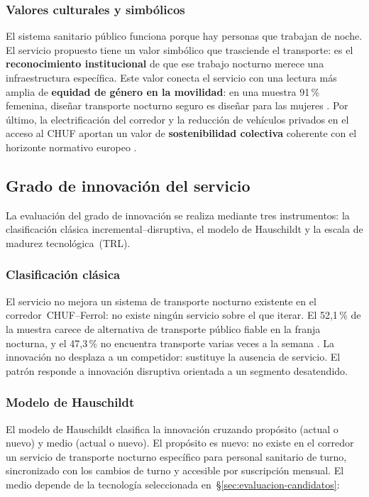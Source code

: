 \subsubsection{Valores culturales y simbólicos}
\label{sec:valores-simbolicos}

El sistema sanitario público funciona porque hay personas que
trabajan de noche. El servicio propuesto tiene un valor simbólico
que trasciende el transporte: es el \textbf{reconocimiento
institucional} de que ese trabajo nocturno merece una
infraestructura específica. Este valor conecta el servicio con
una lectura más amplia de \textbf{equidad de género en la
movilidad}: en una muestra 91\,\% femenina, diseñar transporte
nocturno seguro es diseñar para las mujeres
\parencite{LouridoRegueira2026}. Por último, la electrificación
del corredor y la reducción de vehículos privados en el acceso
al CHUF aportan un valor de \textbf{sostenibilidad colectiva}
coherente con el horizonte normativo europeo
\parencite{CE_Movilidad2020}.

\subsection{Grado de innovación del servicio}
\label{sec:grado-innovacion}

La evaluación del grado de innovación se realiza mediante tres
instrumentos: la clasificación clásica incremental--disruptiva,
el modelo de Hauschildt y la escala de madurez
tecnológica~(TRL).

\subsubsection{Clasificación clásica}

El servicio no mejora un sistema de transporte nocturno existente
en el corredor~\acs{CHUF}--Ferrol: no existe ningún servicio sobre
el que iterar. El 52,1\,\% de la muestra carece de alternativa de
transporte público fiable en la franja nocturna, y el 47,3\,\%
no encuentra transporte varias veces a la semana
\parencite{LouridoRegueira2026}. La innovación no desplaza a un
competidor: sustituye la ausencia de servicio. El patrón responde
a innovación disruptiva orientada a un segmento desatendido.

\subsubsection{Modelo de Hauschildt}

El modelo de Hauschildt clasifica la innovación cruzando propósito
(actual o nuevo) y medio (actual o nuevo). El propósito es nuevo:
no existe en el corredor un servicio de transporte nocturno
específico para personal sanitario de turno, sincronizado con
los cambios de turno y accesible por suscripción mensual. El medio
depende de la tecnología seleccionada
en~§\ref{sec:evaluacion-candidatos}:

